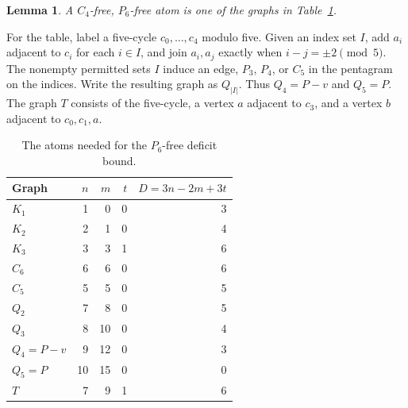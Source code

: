 \documentclass[11pt,a4paper]{article}
\newtheorem{lemma}[theorem]{Lemma}
\theoremstyle{definition}\newtheorem{definition}[theorem]{Definition}
\theoremstyle{remark}\newtheorem{remark}[theorem]{Remark}
\begin{document}
\begin{lemma}\label{local9:lem:atoms}
A $C_4$-free, $P_6$-free atom is one of the graphs in
Table~\ref{local9:tab:atoms}.
\end{lemma}
For the table, label a five-cycle $c_0,\ldots,c_4$ modulo five. Given an
index set $I$, add $a_i$ adjacent to $c_i$ for each $i\in I$, and join
$a_i,a_j$ exactly when $i-j=\pm2\pmod5$. The nonempty permitted sets $I$
induce an edge, $P_3$, $P_4$, or $C_5$ in the pentagram on the indices.
Write the resulting graph as $Q_{|I|}$. Thus $Q_4=P-v$ and $Q_5=P$.
The graph $T$ consists of the five-cycle, a vertex $a$ adjacent to $c_3$,
and a vertex $b$ adjacent to $c_0,c_1,a$.
\begin{table}[ht]
\centering
\caption{The atoms needed for the $P_6$-free deficit bound.}\label{local9:tab:atoms}
\begin{tabular}{lrrrr}\toprule
Graph&$n$&$m$&$t$&$D=3n-2m+3t$\\\midrule
$K_1$&1&0&0&3\\
$K_2$&2&1&0&4\\
$K_3$&3&3&1&6\\
$C_6$&6&6&0&6\\
$C_5$&5&5&0&5\\
$Q_2$&7&8&0&5\\
$Q_3$&8&10&0&4\\
$Q_4=P-v$&9&12&0&3\\
$Q_5=P$&10&15&0&0\\
$T$&7&9&1&6\\\bottomrule
\end{tabular}
\end{table}
\end{document}
